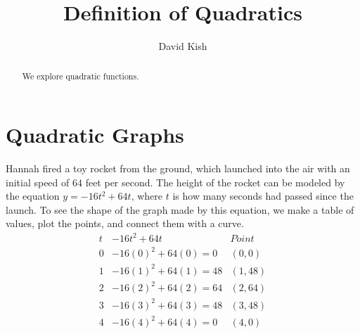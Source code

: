 \documentclass{ximera}
\author{David Kish}
\title{Definition of Quadratics}
\begin{document}
\begin{abstract}
We explore quadratic functions.
\end{abstract}
\maketitle
\licenseORCCA
\section{Quadratic Graphs}
\begin{example}
      Hannah fired a toy rocket from the ground,
      which launched into the air with an initial speed of $64$ feet per second.
      The height of the rocket can be modeled by the equation $y=-16t^2+64t$,
      where $t$ is how many seconds had passed since the launch.
      To see the shape of the graph made by this equation,
      we make a table of values, plot the points, and connect them with a curve.\\
$$
\begin{array}{ccc}
                t & -16t^2+64t & Point\\
\hline
                 0 &  -16(0)^2+64(0) =0 & (0,0) \\
        1& -16(1)^2+64(1) =48&(1,48) \\
          2 & -16(2)^2+64(2) =64 &(2,64)\\
3&-16(3)^2+64(3)=48 &(3,48)\\
            4 & -16(4)^2+64(4)=0  &(4,0)
    \end{array}
$$
\begin{image}
\end{image}
\end{example}
\end{document}
